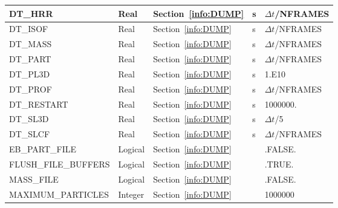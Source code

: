 \documentclass[11pt]{book}
\begin{document}
\begin{longtable}{@{\extracolsep{\fill}}|l|l|l|l|l|}
{\ct DT\_HRR}                       & Real         & Section~\ref{info:DUMP}                &  s        & $\Delta t${\ct /NFRAMES}       \\ \hline
{\ct DT\_ISOF}                      & Real         & Section~\ref{info:DUMP}                &  s        & $\Delta t${\ct /NFRAMES}       \\ \hline
{\ct DT\_MASS}                      & Real         & Section~\ref{info:DUMP}                &  s        & $\Delta t${\ct /NFRAMES}       \\ \hline
{\ct DT\_PART}                      & Real         & Section~\ref{info:DUMP}                &  s        & $\Delta t${\ct /NFRAMES}       \\ \hline
{\ct DT\_PL3D}                      & Real         & Section~\ref{info:DUMP}                &  s        & 1.E10                          \\ \hline
{\ct DT\_PROF}                      & Real         & Section~\ref{info:DUMP}                &  s        & $\Delta t${\ct /NFRAMES}       \\ \hline
{\ct DT\_RESTART}                   & Real         & Section~\ref{info:DUMP}                &  s        & 1000000.                       \\ \hline
{\ct DT\_SL3D}                      & Real         & Section~\ref{info:DUMP}                &  s        & $\Delta t${\ct /5}             \\ \hline
{\ct DT\_SLCF}                      & Real         & Section~\ref{info:DUMP}                &  s        & $\Delta t${\ct /NFRAMES}       \\ \hline
{\ct EB\_PART\_FILE}                & Logical      & Section~\ref{info:DUMP}                &           & {\ct .FALSE.}                  \\ \hline
{\ct FLUSH\_FILE\_BUFFERS}          & Logical      & Section~\ref{info:DUMP}                &           & {\ct .TRUE.}                   \\ \hline
{\ct MASS\_FILE}                    & Logical      & Section~\ref{info:DUMP}                &           & {\ct .FALSE.}                  \\ \hline
{\ct MAXIMUM\_PARTICLES}            & Integer      & Section~\ref{info:DUMP}                &           & 1000000                        \\ \hline

\end{longtable}
\end{document}
